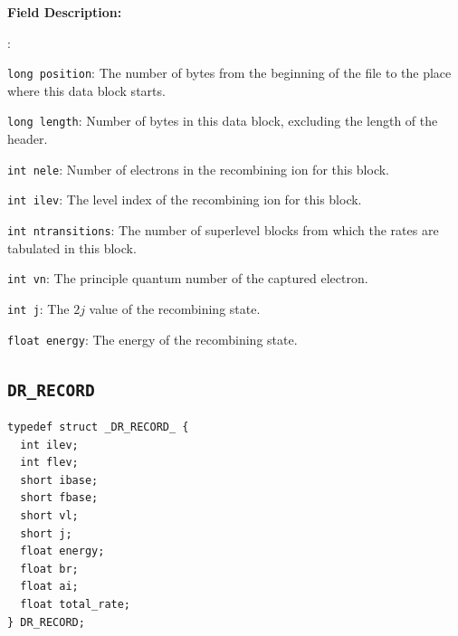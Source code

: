 \documentclass[twoside,letterpaper]{refrep}
\newenvironment{dbdesc}{\textbf{Field Description:} \begin{list}
	{:}{\setlength{\labelwidth}{2in}
	   \setlength{\leftmargin}{2in}
	   \setlength{\labelsep}{0.1in}
	   \setlength{\rightmargin}{0.2in}}}
	{\end{list}}
\begin{document}
\begin{dbdesc}
\item[\texttt{long position}:] The number of bytes from the beginning of the
file to the place where this data block starts.
\item[\texttt{long length}:] Number of bytes in this data block, excluding the
length of the header.
\item[\texttt{int nele}:] Number of electrons in the recombining ion for this
block. 
\item[\texttt{int ilev}:] The level index of the recombining ion for this
block. 
\item[\texttt{int ntransitions}:] The number of superlevel blocks from which
the rates are tabulated in this block.
\item[\texttt{int vn}:] The principle quantum number of the captured electron.
\item[\texttt{int j}:] The $2j$ value of the recombining state.
\item[\texttt{float energy}:] The energy of the recombining state.
\end{dbdesc}

\subsection{\texttt{DR\_RECORD}}
\begin{verbatim}
typedef struct _DR_RECORD_ {
  int ilev;
  int flev;
  short ibase;
  short fbase;
  short vl;
  short j;
  float energy;
  float br;
  float ai;
  float total_rate;
} DR_RECORD;
\end{verbatim}
\end{document}
